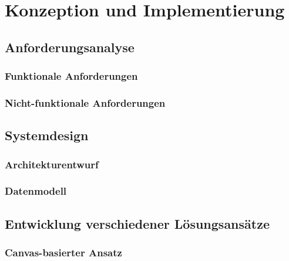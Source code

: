 \chapter{Konzeption und Implementierung}
\label{sec:KonzeptionImplementierung}

\section{Anforderungsanalyse}

\subsection{Funktionale Anforderungen}

\subsection{Nicht-funktionale Anforderungen}

\section{Systemdesign}

\subsection{Architekturentwurf}

\subsection{Datenmodell}

\section{Entwicklung verschiedener Lösungsansätze}

\subsection{Canvas-basierter Ansatz}


